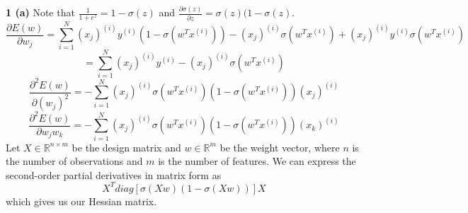 \documentclass[12 pt]{article}        	%
\begin{document}
\textbf{1 (a)} Note that $\frac{1}{1 + e^z} = 1 - \sigma(z) $ and $ \frac{\partial \sigma(z)}{\partial z} = \sigma(z) (1 - \sigma(z)$. 
\[
  \frac{\partial{E(w)}}{\partial w_j} = 
  \sum_{i=1}^{N} (x_j)^{(i)} y^{(i)} (1 - \sigma(w^T x^{(i)}))
  - (x_j)^{(i)} \sigma(w^T x^{(i)}) 
  + (x_j)^{(i)} y^{(i)} \sigma(w^T x^{(i)})
\]
\[
  = \sum_{i=1}^{N} (x_j)^{(i)} y^{(i)} 
  - (x_j)^{(i)} \sigma(w^T x^{(i)}) 
\]
\[
  \frac{\partial^2 E(w)}{\partial (w_j)^2}
  = - \sum_{i=1}^{N} (x_j)^{(i)} \sigma(w^T x^{(i)}) (1 - \sigma(w^T x^{(i)})) (x_j)^{(i)}
\]
\[
  \frac{\partial^2 E(w)}{\partial w_j w_k}
  = - \sum_{i=1}^{N} (x_j)^{(i)} \sigma(w^T x^{(i)}) (1 - \sigma(w^T x^{(i)})) (x_k)^{(i)}
\]
Let $ X \in \mathbb{R}^{n \times m} $ be the design matrix 
and $ w \in \mathbb{R}^m $ be the weight vector, 
where $ n $ is the number of observations
and $ m $ is the number of features. 
We can express the second-order partial derivatives in matrix form as 
\[
  X^T diag[ \sigma(Xw) (1 - \sigma(Xw)) ] X
\]
which gives us our Hessian matrix.
\end{document}

